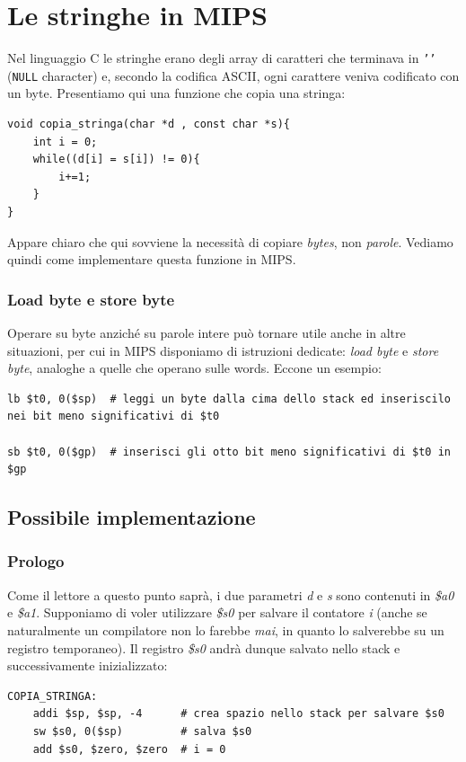 \documentclass[class=book, crop=false]{standalone}
\begin{document}
\section{Le stringhe in MIPS}
Nel linguaggio C le stringhe erano degli array di caratteri che terminava in \texttt{'\0'} (\texttt{NULL} character)
e, secondo la codifica ASCII, ogni carattere veniva codificato con un byte. Presentiamo qui una funzione che copia una stringa:
\begin{verbatim}
void copia_stringa(char *d , const char *s){
	int i = 0;
	while((d[i] = s[i]) != 0){
		i+=1;
	}
}
\end{verbatim}
Appare chiaro che qui sovviene la necessità di copiare \emph{bytes}, non \emph{parole}. Vediamo quindi come implementare questa funzione in MIPS.

\subsubsection{Load byte e store byte}
Operare su byte anziché su parole intere può tornare utile anche in altre situazioni, per cui in MIPS disponiamo di istruzioni dedicate: \emph{load byte} e \emph{store byte}, analoghe a quelle che operano sulle words. Eccone un esempio:
\begin{verbatim}
lb $t0, 0($sp)  # leggi un byte dalla cima dello stack ed inseriscilo nei bit meno significativi di $t0

sb $t0, 0($gp)  # inserisci gli otto bit meno significativi di $t0 in $gp
\end{verbatim}

\subsection{Possibile implementazione}

\subsubsection{Prologo}
Come il lettore a questo punto saprà, i due parametri \emph{d} e \emph{s} sono contenuti in \emph{\$a0} e \emph{\$a1}. Supponiamo di voler utilizzare \emph{\$s0} per salvare il contatore \emph{i} (anche se naturalmente un compilatore non lo farebbe \emph{mai}, in quanto lo salverebbe su un registro temporaneo). Il registro \emph{\$s0} andrà dunque salvato nello stack e successivamente inizializzato:
\begin{verbatim}
COPIA_STRINGA:
	addi $sp, $sp, -4      # crea spazio nello stack per salvare $s0
	sw $s0, 0($sp)         # salva $s0
	add $s0, $zero, $zero  # i = 0
\end{verbatim}
\end{document}
